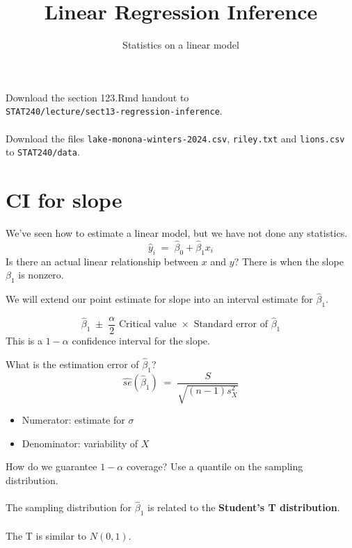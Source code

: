 \documentclass[xcolor={dvipsnames,svgnames},14pt]{beamer}
\title{Linear Regression Inference}
\date{}
\subtitle{Statistics on a linear model}
\begin{document}
\frame{\titlepage}

\begin{frame}
Download the section 123.Rmd handout to \\ 
\texttt{STAT240/lecture/sect13-regression-inference}. \\~\\

Download the files \texttt{lake-monona-winters-2024.csv}, \texttt{riley.txt} and \texttt{lions.csv} to \texttt{STAT240/data}.
\end{frame}

\section{CI for slope}

\begin{frame}
We've seen how to estimate a linear model, but we have not done any statistics.
$$\hat{y}_i \;=\; \hat{\beta}_0 + \hat{\beta}_1x_i$$
Is there an actual linear relationship between $x$ and $y$?  There is when the slope $\beta_1$ is nonzero.
\end{frame}

\begin{frame}
We will extend our point estimate for slope into an interval estimate for $\hat{\beta}_1$. 

$$\hat{\beta}_1 \;\pm\; \frac{\alpha}{2} \text{ Critical value }\times \text{ Standard error of }\hat{\beta}_1$$
This is a $1-\alpha$ confidence interval for the slope.
\end{frame}

\begin{frame}
What is the estimation error of $\hat{\beta}_1$? 
$$\hat{se}(\hat{\beta}_1) \;=\; \frac{S}{\sqrt{(n-1)s_X^2}}$$ \begin{itemize}
\item Numerator: estimate for $\sigma$
\item Denominator: variability of $X$
\end{itemize}
\end{frame}

\begin{frame}
How do we guarantee $1-\alpha$ coverage?  Use a quantile on the sampling distribution. \\~\\

The sampling distribution for $\hat{\beta}_1$ is related to the \textbf{Student's T distribution}. \\~\\

The T is similar to $N(0, 1)$.
\end{frame}
\end{document}

